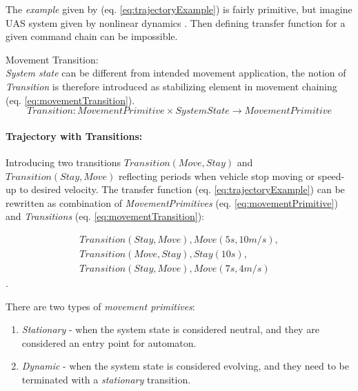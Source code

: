     The \emph{example} given by (eq. \ref{eq:trajectoryExample}) is fairly primitive, but imagine UAS system given by nonlinear dynamics \cite{fossen2011mathematical}. Then defining transfer function for a given command chain can be impossible.

    \begin{definition}{Movement Transition:}\label{def:movementTransition}\\
        \emph{System state} can be different from intended movement application, the notion of \emph{Transition} is therefore introduced as stabilizing element in movement chaining (eq. \ref{eq:movementTransition}).
        \begin{equation}\label{eq:movementTransition}
            Transition:MovementPrimitive\times SystemState \to MovementPrimitive    
        \end{equation}
    \end{definition}

    \paragraph{Trajectory with Transitions:} Introducing two transitions $Transition(Move,Stay)$ and $Transition(Stay,Move)$ reflecting periods when vehicle stop moving or speed-up to desired velocity. The transfer function (eq. \ref{eq:trajectoryExample}) can be rewritten as combination of \emph{MovementPrimitives} (eq. \ref{eq:movementPrimitive}) and \emph{Transitions} (eq. \ref{eq:movementTransition}):
    
    \begin{multline}
        Transition(Stay,Move), Move(5s,10m/s),\\
        Transition(Move,Stay), Stay(10s),\\ 
        Transition(Stay,Move), Move(7s,4m/s)
    \end{multline}.

    \begin{note} There are two types of \emph{movement primitives}:
    \begin{enumerate}
        \item \emph{Stationary} - when the system state is considered neutral, and they are considered an entry point for automaton.
        \item \emph{Dynamic} - when the system state is considered evolving, and they need to be terminated with a \emph{stationary} transition.
    \end{enumerate}
    \end{note}

